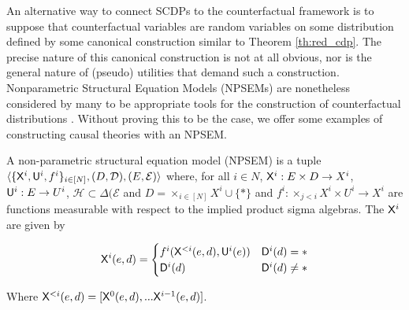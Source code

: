 An alternative way to connect SCDPs to the counterfactual framework is to suppose that counterfactual variables are random variables on some distribution defined by some canonical construction similar to Theorem \ref{th:red_cdp}. The precise nature of this canonical construction is not at all obvious, nor is the general nature of (pseudo) utilities that demand such a construction. Nonparametric Structural Equation Models (NPSEMs) are nonetheless considered by many to be appropriate tools for the construction of counterfactual distributions \cite{pearl_causality:_2009,richardson2013single}. Without proving this to be the case, we offer some examples of constructing causal theories with an NPSEM.

\begin{definition}[NPSEM]\label{def:NPSEM}
A non-parametric structural equation model (NPSEM) is a tuple $\langle \{\mathsf{X}^i, \mathsf{U}^i, f^i\}_{i\in[N]}, (D,\mathcal{D}), (E,\mathcal{E})\rangle$ where, for all $i\in N$, $\mathsf{X}^i:E\times D \to X^i$, $\mathsf{U}^i:E\to U^i$, $\mathscr{H}\subset\Delta(\mathcal{E}$ and $D=\times_{i\in[N]} X^i\cup\{*\}$ and $f^i:\times_{j<i} X^i\times U^i\to X^i$ are functions measurable with respect to the implied product sigma algebras. The $\mathsf{X}^i$ are given by

\begin{align}
    \mathsf{X}^i(e,d) = \begin{cases} f^i(\mathsf{X}^{<i}(e,d),\mathsf{U}^i(e)) &\mathsf{D}^i(d)=*\\ 
    \mathsf{D}^i(d)  &\mathsf{D}^i(d)\neq * \end{cases}
\end{align}

Where $\mathsf{X}^{<i}(e,d)=[\mathsf{X}^0(e,d),...\mathsf{X}^{i-1}(e,d)]$.
\end{definition}

